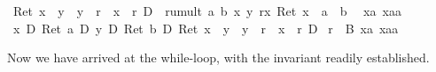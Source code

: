 \begin{isabellebody}
\begin{isamarkuptxt}
    \begin{isabelle}%
{\isasymturnstile}\ Ret\ {\isacharparenleft}x\ {\isasymnoteq}\ y\ {\isasymand}\ y\ {\isasymnoteq}\ r\ {\isasymand}\ x\ {\isasymnoteq}\ r{\isacharparenright}\ {\isasymlongrightarrow}\isactrlsub D\ {\isacharbrackleft}{\isacharhash}\ rumult\ a\ b\ x\ y\ r{\isacharbrackright}{\isacharparenleft}{\isasymlambda}x{\isachardot}\ Ret\ {\isacharparenleft}x\ {\isacharequal}\ a\ {\isacharasterisk}\ b{\isacharparenright}{\isacharparenright}\isanewline
\ {}{\isachardot}\ {\isasymAnd}xa\ xaa{\isachardot}\isanewline
{}\ {\isacharasterisk}x\ {\isacharequal}\isactrlsub D\ Ret\ a\ {\isasymand}\isactrlsub D\ {\isacharasterisk}y\ {\isacharequal}\isactrlsub D\ Ret\ b\ {\isasymand}\isactrlsub D\ Ret\ {\isacharparenleft}x\ {\isasymnoteq}\ y\ {\isasymand}\ y\ {\isasymnoteq}\ r\ {\isasymand}\ x\ {\isasymnoteq}\ r{\isacharparenright}\ {\isasymlongrightarrow}\isactrlsub D\isanewline
{}\ r\ {\isacharcolon}{\isacharequal}\ {}{\isacharbrackright}{\isacharquery}B{}{}\ xa\ xaa%
\end{isabelle}%
\end{isamarkuptxt}%
\isamarkuptrue%
\isamarkupfalse%
\isamarkupfalse%
\isamarkupfalse%
\isamarkupfalse%
\isamarkupfalse%
\isamarkupfalse%
\isamarkupfalse%
\isamarkupfalse%
\isamarkupfalse%
\isamarkupfalse%
\isamarkupfalse%
\isamarkupfalse%
\isamarkupfalse%
\isamarkupfalse%
\isamarkupfalse%
\isamarkupfalse%
\isamarkupfalse%
\isamarkupfalse%
\isamarkupfalse%
%
\begin{isamarkuptxt}%
Now we have arrived at the while-loop, with the invariant readily established.


\end{isamarkuptxt}
\end{isabellebody}
